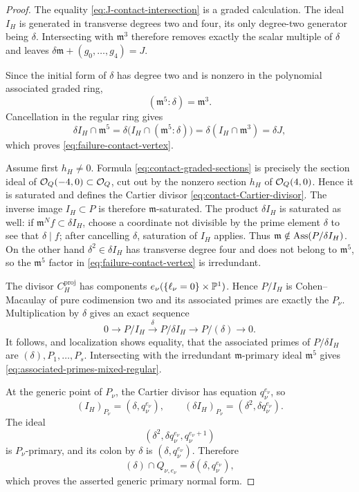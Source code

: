 \begin{proof}
The equality \eqref{eq:J-contact-intersection} is a graded
calculation.  The ideal \(I_H\) is generated in transverse degrees
two and four, its only degree-two generator being \(\delta\).
Intersecting with \(\mathfrak m^3\) therefore removes exactly the
scalar multiple of \(\delta\) and leaves
\(\delta\mathfrak m+(g_0,\ldots,g_4)=J\).

Since the initial form of \(\delta\) has degree two and is nonzero in
the polynomial associated graded ring,
\[
 (\mathfrak m^5:\delta)=\mathfrak m^3.
\]
Cancellation in the regular ring gives
\[
 \delta I_H\cap\mathfrak m^5
 =\delta\bigl(I_H\cap(\mathfrak m^5:\delta)\bigr)
 =\delta(I_H\cap\mathfrak m^3)
 =\delta J,
\]
which proves \eqref{eq:failure-contact-vertex}.

Assume first \(h_H\ne0\).  Formula
\eqref{eq:contact-graded-sections} is precisely the section ideal of
\(\mathcal O_Q(-4,0)\subset\mathcal O_Q\), cut out by the nonzero section \(h_H\)
of \(\mathcal O_Q(4,0)\).  Hence it is saturated and defines the Cartier
divisor \eqref{eq:contact-Cartier-divisor}.  The inverse image
\(I_H\subset P\) is therefore \(\mathfrak m\)-saturated.  The product
\(\delta I_H\) is saturated as well: if
\(\mathfrak m^N f\subset\delta I_H\), choose a coordinate not
divisible by the prime element \(\delta\) to see that \(\delta\mid f\);
after cancelling \(\delta\), saturation of \(I_H\) applies.
Thus \(\mathfrak m\notin\operatorname{Ass}(P/\delta I_H)\).
On the other hand \(\delta^2\in\delta I_H\) has transverse degree
four and does not belong to \(\mathfrak m^5\), so the
\(\mathfrak m^5\) factor in
\eqref{eq:failure-contact-vertex} is irredundant.

The divisor \(C_H^{\mathrm{proj}}\) has components
\(e_\nu(\{\ell_\nu=0\}\times\mathbb P^1)\).  Hence
\(P/I_H\) is Cohen--Macaulay of pure codimension two and its associated
primes are exactly the \(P_\nu\).  Multiplication by \(\delta\) gives
an exact sequence
\[
 0\longrightarrow P/I_H
 \xrightarrow{\ \delta\ } P/\delta I_H
 \longrightarrow P/(\delta)\longrightarrow0.
\]
It follows, and localization shows equality, that the associated
primes of \(P/\delta I_H\) are
\((\delta),P_1,\ldots,P_s\).  Intersecting with the irredundant
\(\mathfrak m\)-primary ideal \(\mathfrak m^5\) gives
\eqref{eq:associated-primes-mixed-regular}.

At the generic point of \(P_\nu\), the Cartier divisor has equation
\(q_\nu^{e_\nu}\), so
\[
 (I_H)_{P_\nu}=(\delta,q_\nu^{e_\nu}),\qquad
 (\delta I_H)_{P_\nu}
 =(\delta^2,\delta q_\nu^{e_\nu}).
\]
The ideal
\[
 (\delta^2,\delta q_\nu^{e_\nu},q_\nu^{e_\nu+1})
\]
is \(P_\nu\)-primary, and its colon by \(\delta\) is
\((\delta,q_\nu^{e_\nu})\).  Therefore
\[
 (\delta)\cap Q_{\nu,e_\nu}
 =
 \delta(\delta,q_\nu^{e_\nu}),
\]
which proves the asserted generic primary normal form.


\end{proof}
